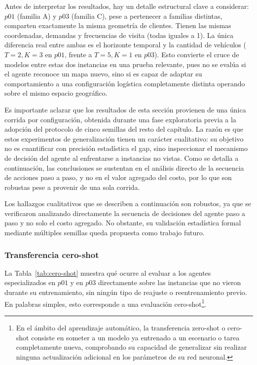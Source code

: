 Antes de interpretar los resultados, hay un detalle estructural clave a considerar: $p01$ (familia A) y $p03$ (familia C), pese a pertenecer a familias distintas, comparten exactamente la misma geometría de clientes. Tienen las mismas coordenadas, demandas y frecuencias de visita (todas iguales a 1). La única diferencia real entre ambas es el horizonte temporal y la cantidad de vehículos ($T{=}2, K{=}3$ en $p01$, frente a $T{=}5, K{=}1$ en $p03$). Esto convierte el cruce de modelos entre estas dos instancias en una prueba relevante, pues no se evalúa si el agente reconoce un mapa nuevo, sino si es capaz de adaptar su comportamiento a una configuración logística completamente distinta operando sobre el mismo espacio geográfico.

Es importante aclarar que los resultados de esta sección provienen de una única corrida por configuración, obtenida durante una fase exploratoria previa a la adopción del protocolo de cinco semillas del resto del capítulo. La razón es que estos experimentos de generalización tienen un carácter cualitativo: su objetivo no es cuantificar con precisión estadística el gap, sino inspeccionar el mecanismo de decisión del agente al enfrentarse a instancias no vistas. Como se detalla a continuación, las conclusiones se sustentan en el análisis directo de la secuencia de acciones paso a paso, y no en el valor agregado del costo, por lo que son robustas pese a provenir de una sola corrida.  

Los hallazgos cualitativos que se describen a continuación son robustos, ya que se verificaron analizando directamente la secuencia de decisiones del agente paso a paso y no solo el costo agregado. No obstante, su validación estadística formal mediante múltiples semillas queda propuesta como trabajo futuro.

\subsubsection{Transferencia cero-shot}
La Tabla~\ref{tab:cero-shot} muestra qué ocurre al evaluar a los agentes especializados en $p01$ y en $p03$ directamente sobre las instancias que no vieron durante su entrenamiento, sin ningún tipo de reajuste o reentrenamiento previo. En palabras simples, esto corresponde a una evaluación cero-shot\footnote{En el ámbito del aprendizaje automático, la transferencia zero-shot o cero-shot consiste en someter a un modelo ya entrenado a un escenario o tarea completamente nueva, comprobando su capacidad de generalizar sin realizar ninguna actualización adicional en los parámetros de su red neuronal.}.


